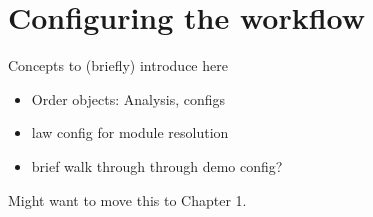 \section{Configuring the workflow}\label{sec:configs}

Concepts to (briefly) introduce here
\begin{itemize}
	\item Order objects: Analysis, configs
	\item law config for module resolution
	\item brief walk through through demo config?
\end{itemize}

Might want to move this to Chapter 1.
